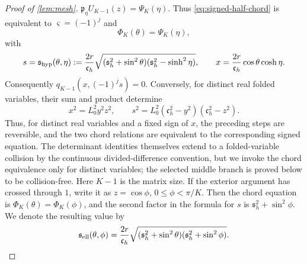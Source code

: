 \documentclass[review,hidelinks,onefignum,onetabnum]{siamart251216}
\begin{document}
\begin{proof}[Proof of \cref{lem:mesh}]
\(\mathfrak p_\eta U_{K-1}(z)=\Psi_K(\eta)\).  Thus
\eqref{eq:signed-half-chord} is equivalent to
\(\varsigma=(-1)^j\) and
\begin{equation}\label{eq:chord-equation}
 \Phi_K(\theta)=\Psi_K(\eta),
\end{equation}
with
\begin{equation}\label{eq:channel-xs}
 s=\mathfrak s_{\rm hyp}(\theta,\eta)
 :=\frac{2r}{\mathfrak c_h}
 \sqrt{(\mathfrak s_h^2+\sin^2\theta)
       (\mathfrak s_h^2-\sinh^2\eta)},\qquad
 x=\frac{2r}{\mathfrak c_h}\cos\theta\cosh\eta.
\end{equation}
Consequently \(q_{K-1}(x,(-1)^js)=0\).  Conversely, for distinct real
folded variables, their sum and product determine
\[
 x^2=L_0^2y^2z^2,\qquad
 s^2=L_0^2(\mathfrak c_h^2-y^2)(\mathfrak c_h^2-z^2).
\]
Thus, for distinct real variables and a fixed sign of \(x\), the
preceding steps are reversible, and the two chord relations are
equivalent to the corresponding signed equation.  The determinant
identities themselves extend to a folded-variable collision by the
continuous divided-difference convention, but we invoke the chord
equivalence only for distinct variables; the selected middle branch is
proved below to be collision-free.
Here \(K-1\) is the matrix size.  If the exterior argument has crossed
through \(1\), write it as \(z=\cos\phi\),
\(0\leq\phi<\pi/K\).  Then the chord equation is
\(\Phi_K(\theta)=\Phi_K(\phi)\), and the second factor in the formula
for \(s\) is \(\mathfrak s_h^2+\sin^2\phi\).  We denote the resulting
value by
\[
 \mathfrak s_{\rm ell}(\theta,\phi)
 =\frac{2r}{\mathfrak c_h}
 \sqrt{(\mathfrak s_h^2+\sin^2\theta)
       (\mathfrak s_h^2+\sin^2\phi)}.
\]


\end{proof}
\end{document}
